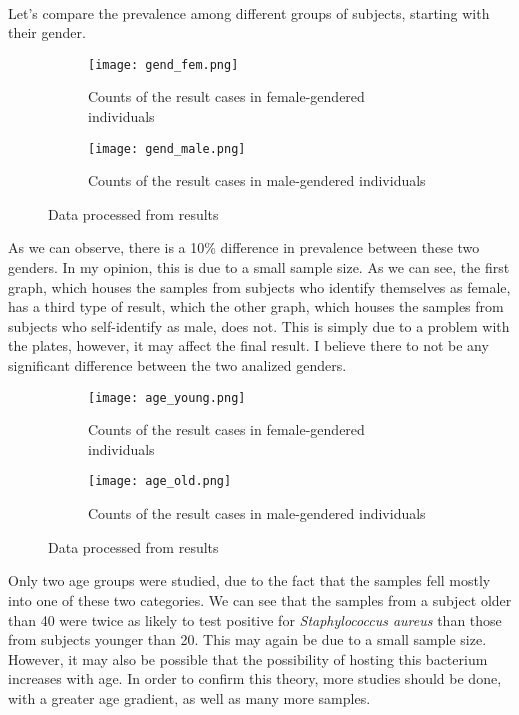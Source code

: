 \paragraph{}Let's compare the prevalence among different groups of subjects, starting with their gender.
\begin{center}\begin{figure}[H]\centering\begin{subfigure}[b]{0.4\linewidth}\texttt{[image: gend\_fem.png]}\caption{Counts of the result cases in female-gendered individuals}\end{subfigure}\begin{subfigure}[b]{0.38\linewidth}\texttt{[image: gend\_male.png]}\caption{Counts of the result cases in male-gendered individuals}\end{subfigure}\caption{Data processed from results}\end{figure}\end{center}\vspace{-1.5em}
As we can observe, there is a 10\% difference in prevalence between these two genders. In my opinion, this is due to a small sample size. As we can see, the first graph, which houses the samples from subjects who identify themselves as female, has a third type of result, which the other graph, which houses the samples from subjects who self-identify as male, does not. This is simply due to a problem with the plates, however, it may affect the final result. I believe there to not be any significant difference between the two analized genders.
\begin{center}\begin{figure}[H]\centering\begin{subfigure}[b]{0.4\linewidth}\texttt{[image: age\_young.png]}\caption{Counts of the result cases in female-gendered individuals}\end{subfigure}\begin{subfigure}[b]{0.38\linewidth}\texttt{[image: age\_old.png]}\caption{Counts of the result cases in male-gendered individuals}\end{subfigure}\caption{Data processed from results}\end{figure}\end{center}\vspace{-1.5em}
Only two age groups were studied, due to the fact that the samples fell mostly into one of these two categories. We can see that the samples from a subject older than 40 were twice as likely to test positive for \emph{Staphylococcus aureus} than those from subjects younger than 20. This may again be due to a small sample size. However, it may also be possible that the possibility of hosting this bacterium increases with age. In order to confirm this theory, more studies should be done, with a greater age gradient, as well as many more samples.
